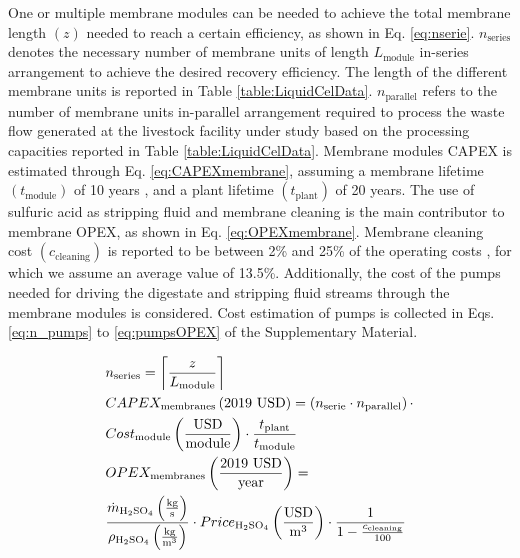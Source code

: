 \begin{refsection}[referencesCh6]

One or multiple membrane modules can be needed to achieve the total membrane length $\left( z \right)$ needed to reach a certain efficiency, as shown in Eq. \ref{eq:nserie}. $n_{\text{series}}$ denotes the necessary number of membrane units of length $L_{\text{module}}$ in-series arrangement to achieve the desired recovery efficiency. The length of the different membrane units is reported in Table \ref{table:LiquidCelData}. $n_{\text{parallel}}$ refers to the number of membrane units in-parallel arrangement required to process the waste flow generated at the livestock facility under study based on the processing capacities reported in Table \ref{table:LiquidCelData}. Membrane modules CAPEX is estimated through Eq. \ref{eq:CAPEXmembrane}, assuming a membrane lifetime $\left(t_{\text{module}}\right)$ of 10 years \citep{verrecht2010cost}, and a plant lifetime $\left(t_{\text{plant}}\right)$ of 20 years. The use of sulfuric acid as stripping fluid and membrane cleaning is the main contributor to membrane OPEX, as shown in Eq. \ref{eq:OPEXmembrane}. Membrane cleaning cost $\left(c_{\text{cleaning}}\right)$ is reported to be between 2\% and 25\% of the operating costs \citep{yu2020performance, verrecht2010cost}, for which we assume an average value of 13.5\%. 
Additionally, the cost of the pumps needed for driving the digestate and stripping fluid streams through the membrane modules is considered. Cost estimation of pumps is collected in
Eqs. \ref{eq:n_pumps} to \ref{eq:pumpsOPEX} of the Supplementary Material.

\begin{align}
	& n_{\text{series}} = \ceil*{\frac{z}{L_{\text{module}}}} \label{eq:nserie}
	\\
	& CAPEX_{\text{membranes}} \left(\text{2019 USD}\right)= \left(n_{\text{serie}} \cdot n_{\text{parallel}}\right) \cdot \nonumber \\
	& Cost_{\text{module}} \left(\frac{\text{USD}}{\text{module}}\right) \cdot \frac{t_{\text{plant}}}{t_{\text{module}}} \label{eq:CAPEXmembrane}
	\\
	& OPEX_{\text{membranes}} \left(\frac{\text{2019 USD}}{\text{year}}\right) = \nonumber \\
	& \frac{\dot{m}_{\text{H}_2 \text{SO}_4} \left(\frac{\text{kg}}{\text{s}}\right)}{\rho_{\text{H}_2 \text{SO}_4} \left(\frac{\text{kg}}{\text{m}^3}\right)} \cdot Price_{\text{H}_2 \text{SO}_4} \left(\frac{\text{USD}}{\text{m}^3}\right) \cdot \frac{1}{1-\frac{c_{\text{cleaning}}}{100}} \label{eq:OPEXmembrane}
\end{align}


\end{refsection}
